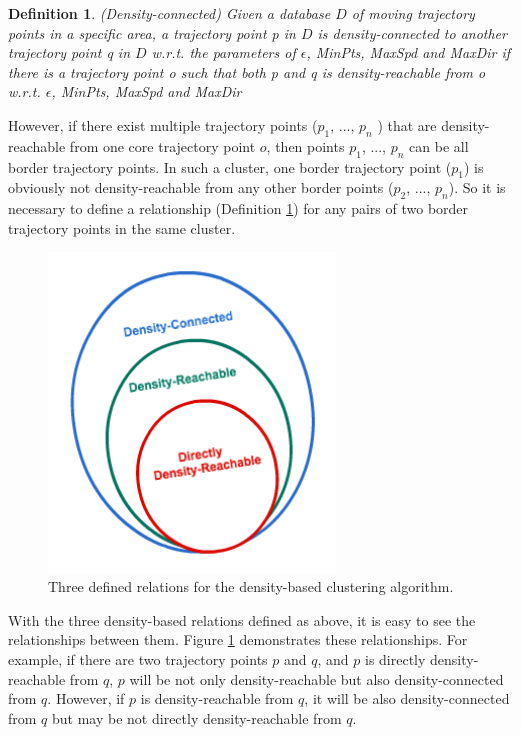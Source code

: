 \documentclass[12pt,glossary]{dalcsthesis}
\newtheorem{definition}{Definition}
\begin{document}
\begin{definition}
\label{def:density_connected}
(Density-connected)
Given a database $D$ of moving trajectory points in a specific area, a trajectory point p in $D$ is density-connected to another trajectory point q in $D$ w.r.t. the parameters of $\epsilon$, MinPts, MaxSpd and MaxDir if there is a trajectory point o such that both p and q is density-reachable from o w.r.t.  $\epsilon$, MinPts, MaxSpd and MaxDir
\end{definition}

However, if there exist multiple trajectory points ($p_1$, ..., $p_n$ ) that are density-reachable from one core trajectory point $o$, then points $p_1$, ..., $p_n$ can be all border trajectory points.  In such a cluster, one border trajectory point ($p_1$) is obviously not density-reachable from any other border points ($p_2$, ..., $p_n$). So it is necessary to define a relationship (Definition \ref{def:density_connected}) for any pairs of two border trajectory points in the same cluster.

\begin{figure}[!htb]
\centering
\includegraphics[width=3in]{relations.png}%
\caption{Three defined relations for the density-based clustering algorithm.}
\label{fig:relations}
\end{figure}


With the three density-based relations defined as above, it is easy to see the relationships between them. Figure \ref{fig:relations} demonstrates these relationships. For example, if there are two trajectory points $p$ and $q$, and $p$ is directly density-reachable from $q$, $p$ will be not only density-reachable but also density-connected from $q$. However, if $p$ is density-reachable from $q$, it will be also density-connected from $q$ but may be not directly density-reachable from $q$. 
\end{document}
